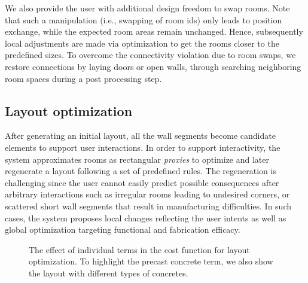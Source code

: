 We also provide the user with additional design freedom to swap rooms. Note that such a manipulation (i.e., swapping of room ids) only leads to position exchange, while the expected room areas remain unchanged. Hence, subsequently local adjustments are made via optimization to get the rooms closer to the predefined sizes. To overcome the connectivity violation due to room swaps, we restore connections by laying doors or open walls, through searching neighboring room spaces during a post processing step.

\subsection{Layout optimization}

After generating an initial layout, all the wall segments become candidate elements to support user interactions. In order to support interactivity, the system approximates rooms as rectangular {\em proxies} to optimize and later regenerate a layout following a set of predefined rules. The regeneration is challenging since the user cannot easily predict possible consequences after arbitrary interactions such as irregular rooms leading to undesired corners, or scattered short wall segments that result in manufacturing difficulties. In such cases, the system proposes local changes reflecting the user intents as well as global optimization targeting functional and fabrication efficacy.

\begin{figure*}[t!]
\centering
{}
\caption[The effect of individual terms in the cost function.]{The effect of individual terms in the cost function for layout optimization. To highlight the precast concrete term, we also show the layout with different types of concretes.}
\label{fig:costFunc}
\vspace{-.1in}
\end{figure*}

